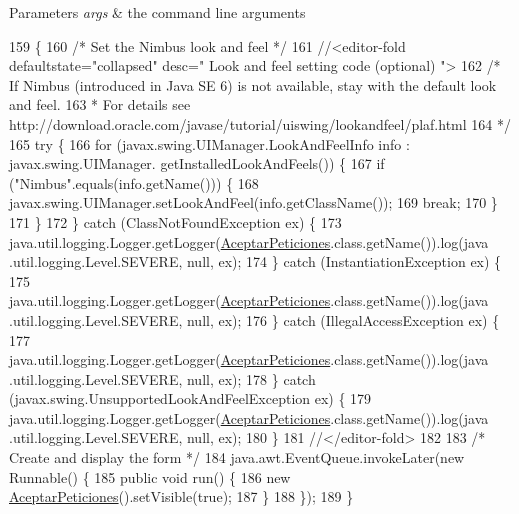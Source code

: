 \begin{DoxyParams}{Parameters}
{\em args} & the command line arguments \\
\hline
\end{DoxyParams}

\begin{DoxyCode}
159                                            \{
160         \textcolor{comment}{/* Set the Nimbus look and feel */}
161         \textcolor{comment}{//<editor-fold defaultstate="collapsed" desc=" Look and feel setting code (optional) ">}
162         \textcolor{comment}{/* If Nimbus (introduced in Java SE 6) is not available, stay with the default look and feel.}
163 \textcolor{comment}{         * For details see http://download.oracle.com/javase/tutorial/uiswing/lookandfeel/plaf.html }
164 \textcolor{comment}{         */}
165         \textcolor{keywordflow}{try} \{
166             \textcolor{keywordflow}{for} (javax.swing.UIManager.LookAndFeelInfo info : javax.swing.UIManager.
      getInstalledLookAndFeels()) \{
167                 \textcolor{keywordflow}{if} (\textcolor{stringliteral}{"Nimbus"}.equals(info.getName())) \{
168                     javax.swing.UIManager.setLookAndFeel(info.getClassName());
169                     \textcolor{keywordflow}{break};
170                 \}
171             \}
172         \} \textcolor{keywordflow}{catch} (ClassNotFoundException ex) \{
173             java.util.logging.Logger.getLogger(\mbox{\hyperlink{classsoftware_1_1_aceptar_peticiones_a0e69d28d493fab6343457aef7bc93d45}{AceptarPeticiones}}.class.getName()).log(java
      .util.logging.Level.SEVERE, null, ex);
174         \} \textcolor{keywordflow}{catch} (InstantiationException ex) \{
175             java.util.logging.Logger.getLogger(\mbox{\hyperlink{classsoftware_1_1_aceptar_peticiones_a0e69d28d493fab6343457aef7bc93d45}{AceptarPeticiones}}.class.getName()).log(java
      .util.logging.Level.SEVERE, null, ex);
176         \} \textcolor{keywordflow}{catch} (IllegalAccessException ex) \{
177             java.util.logging.Logger.getLogger(\mbox{\hyperlink{classsoftware_1_1_aceptar_peticiones_a0e69d28d493fab6343457aef7bc93d45}{AceptarPeticiones}}.class.getName()).log(java
      .util.logging.Level.SEVERE, null, ex);
178         \} \textcolor{keywordflow}{catch} (javax.swing.UnsupportedLookAndFeelException ex) \{
179             java.util.logging.Logger.getLogger(\mbox{\hyperlink{classsoftware_1_1_aceptar_peticiones_a0e69d28d493fab6343457aef7bc93d45}{AceptarPeticiones}}.class.getName()).log(java
      .util.logging.Level.SEVERE, null, ex);
180         \}
181         \textcolor{comment}{//</editor-fold>}
182 
183         \textcolor{comment}{/* Create and display the form */}
184         java.awt.EventQueue.invokeLater(\textcolor{keyword}{new} Runnable() \{
185             \textcolor{keyword}{public} \textcolor{keywordtype}{void} run() \{
186                 \textcolor{keyword}{new} \mbox{\hyperlink{classsoftware_1_1_aceptar_peticiones_a0e69d28d493fab6343457aef7bc93d45}{AceptarPeticiones}}().setVisible(\textcolor{keyword}{true});
187             \}
188         \});
189     \}
\end{DoxyCode}


